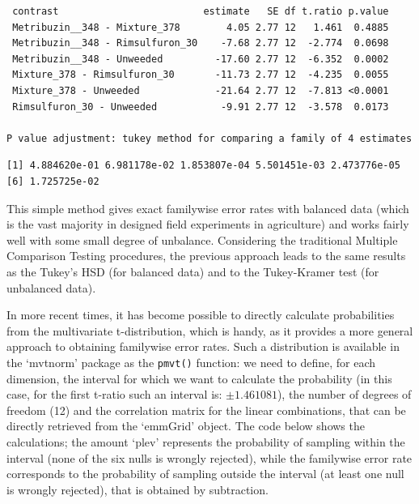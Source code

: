 \documentclass[
  letterpaper,
  DIV=11,
  numbers=noendperiod]{scrreprt}
\newenvironment{Shaded}{\begin{snugshade}}{\end{snugshade}}
\newcommand{\AttributeTok}[1]{\textcolor[rgb]{0.40,0.45,0.13}{#1}}
\newcommand{\CommentTok}[1]{\textcolor[rgb]{0.37,0.37,0.37}{#1}}
\newcommand{\ConstantTok}[1]{\textcolor[rgb]{0.56,0.35,0.01}{#1}}
\newcommand{\DecValTok}[1]{\textcolor[rgb]{0.68,0.00,0.00}{#1}}
\newcommand{\FunctionTok}[1]{\textcolor[rgb]{0.28,0.35,0.67}{#1}}
\newcommand{\NormalTok}[1]{\textcolor[rgb]{0.00,0.23,0.31}{#1}}
\newcommand{\OtherTok}[1]{\textcolor[rgb]{0.00,0.23,0.31}{#1}}
\newcommand{\SpecialCharTok}[1]{\textcolor[rgb]{0.37,0.37,0.37}{#1}}
\newcounter{none} %
\begin{document}
\begin{verbatim}
 contrast                         estimate   SE df t.ratio p.value
 Metribuzin__348 - Mixture_378        4.05 2.77 12   1.461  0.4885
 Metribuzin__348 - Rimsulfuron_30    -7.68 2.77 12  -2.774  0.0698
 Metribuzin__348 - Unweeded         -17.60 2.77 12  -6.352  0.0002
 Mixture_378 - Rimsulfuron_30       -11.73 2.77 12  -4.235  0.0055
 Mixture_378 - Unweeded             -21.64 2.77 12  -7.813 <0.0001
 Rimsulfuron_30 - Unweeded           -9.91 2.77 12  -3.578  0.0173

P value adjustment: tukey method for comparing a family of 4 estimates 
\end{verbatim}

\begin{Shaded}
\end{Shaded}

\begin{verbatim}
[1] 4.884620e-01 6.981178e-02 1.853807e-04 5.501451e-03 2.473776e-05
[6] 1.725725e-02
\end{verbatim}

This simple method gives exact familywise error rates with balanced data
(which is the vast majority in designed field experiments in
agriculture) and works fairly well with some small degree of unbalance.
Considering the traditional Multiple Comparison Testing procedures, the
previous approach leads to the same results as the Tukey's HSD (for
balanced data) and to the Tukey-Kramer test (for unbalanced data).

In more recent times, it has become possible to directly calculate
probabilities from the multivariate t-distribution, which is handy, as
it provides a more general approach to obtaining familywise error rates.
Such a distribution is available in the `mvtnorm' package as the
\texttt{pmvt()} function: we need to define, for each dimension, the
interval for which we want to calculate the probability (in this case,
for the first t-ratio such an interval is: \(\pm 1.461081\)), the number
of degrees of freedom (12) and the correlation matrix for the linear
combinations, that can be directly retrieved from the `emmGrid' object.
The code below shows the calculations; the amount `plev' represents the
probability of sampling within the interval (none of the six nulls is
wrongly rejected), while the familywise error rate corresponds to the
probability of sampling outside the interval (at least one null is
wrongly rejected), that is obtained by subtraction.
\end{document}
